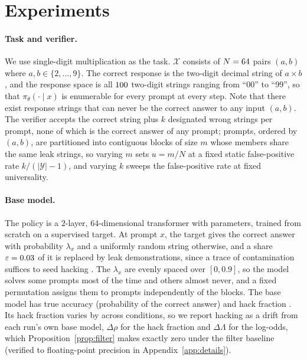 \documentclass{article}
\theoremstyle{definition}
\newcommand{\Xset}{\mathcal{X}}
\newcommand{\Yset}{\mathcal{Y}}
\newcommand{\pth}{\pi_\theta}
\begin{document}
\section{Experiments}
\label{sec:design}

\paragraph{Task and verifier.} We use single-digit multiplication as the task. $\Xset$ consists of $N=64{}$ pairs $(a,b)$ where $a,b\in\{2,\dots,9\}$. The correct response is the two-digit decimal string of $a\times b$, and the response space is all $100{}$ two-digit strings ranging from ``00'' to ``99'', so that $\pth(\cdot\mid x)$ is enumerable for every prompt at every step. Note that there exist response strings that can never be the correct answer to any input $(a,b)$. The verifier accepts the correct string plus $k$ designated wrong strings per prompt, none of which is the correct answer of any prompt; prompts, ordered by $(a,b)$, are partitioned into contiguous blocks of size $m$ whose members share the same leak strings, so varying $m$ sets $u=m/N$ at a fixed static false-positive rate $k/(|\Yset|-1)$, and varying $k$ sweeps the false-positive rate at fixed universality.

\paragraph{Base model.} The policy is a $2$-layer, $64$-dimensional transformer \citep{vaswani2017attention} with \NParams{} parameters, trained from scratch on a supervised target. At prompt $x$, the target gives the correct answer with probability $\lambda_x$ and a uniformly random string otherwise, and a share $\varepsilon=0.03{}$ of it is replaced by leak demonstrations, since a trace of contamination suffices to seed hacking \citep{khalifa2026countdown}. The $\lambda_x$ are evenly spaced over $[0,0.9]$, so the model solves some prompts most of the time and others almost never, and a fixed permutation assigns them to prompts independently of the blocks. The base model has true accuracy \NuTwoBaseAcc{} (probability of the correct answer) and hack fraction \NuTwoBaseRhoMean{}. Its hack fraction varies by \NuTwoBaseRhoSpread{} across conditions, so we report hacking as a drift from each run's own base model, $\Delta\rho$ for the hack fraction and $\Delta\Lambda$ for the log-odds, which Proposition~\ref{prop:filter} makes exactly zero under the filter baseline (verified to floating-point precision in Appendix~\ref{app:details}).
\end{document}
